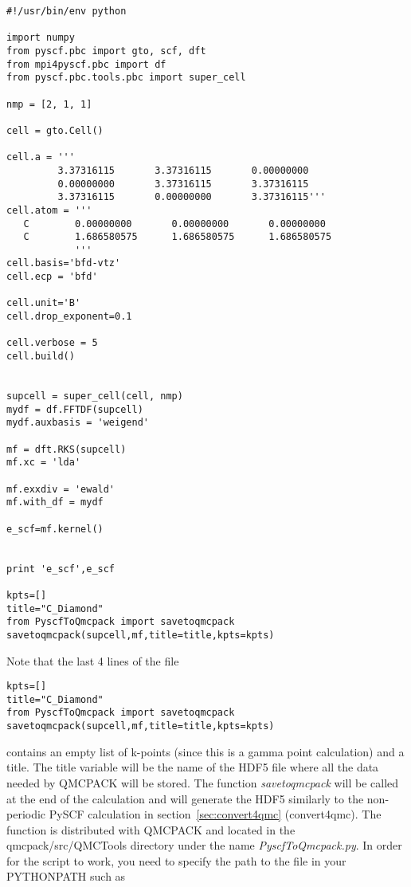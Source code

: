 \begin{lstlisting}[style=Python,caption=Example PySCF input for single k-point calculation for a 2x1x1 Carbon supercell.]
#!/usr/bin/env python

import numpy
from pyscf.pbc import gto, scf, dft
from mpi4pyscf.pbc import df 
from pyscf.pbc.tools.pbc import super_cell

nmp = [2, 1, 1]

cell = gto.Cell()

cell.a = '''
         3.37316115       3.37316115       0.00000000
         0.00000000       3.37316115       3.37316115
         3.37316115       0.00000000       3.37316115'''
cell.atom = '''  
   C        0.00000000       0.00000000       0.00000000
   C        1.686580575      1.686580575      1.686580575 
            '''
cell.basis='bfd-vtz'
cell.ecp = 'bfd'

cell.unit='B'
cell.drop_exponent=0.1

cell.verbose = 5
cell.build()


supcell = super_cell(cell, nmp)
mydf = df.FFTDF(supcell)
mydf.auxbasis = 'weigend'

mf = dft.RKS(supcell)
mf.xc = 'lda'

mf.exxdiv = 'ewald'
mf.with_df = mydf

e_scf=mf.kernel()


print 'e_scf',e_scf

kpts=[]
title="C_Diamond"
from PyscfToQmcpack import savetoqmcpack
savetoqmcpack(supcell,mf,title=title,kpts=kpts)

\end{lstlisting}

Note that the last 4 lines of the file
\begin{lstlisting}[style=Python]
kpts=[]
title="C_Diamond"
from PyscfToQmcpack import savetoqmcpack
savetoqmcpack(supcell,mf,title=title,kpts=kpts)
\end{lstlisting}

contains an empty list of k-points (since this is a gamma point
calculation) and a title. The title variable will be the name of the
HDF5 file where all the data needed by QMCPACK will be stored.  The
function \textit{savetoqmcpack} will be called at the end of the
calculation and will generate the HDF5 similarly to the non-periodic
PySCF calculation in section~\ref{sec:convert4qmc} (convert4qmc). The
function is distributed with QMCPACK and located in the
qmcpack/src/QMCTools directory under the name
\textit{PyscfToQmcpack.py}. In order for the script to work, you need
to specify the path to the file in your PYTHONPATH such as

